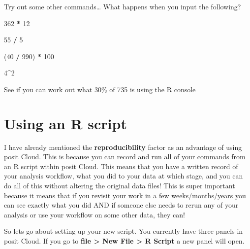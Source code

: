 \documentclass[
]{book}
\newenvironment{Shaded}{\begin{snugshade}}{\end{snugshade}}
\newcommand{\DecValTok}[1]{\textcolor[rgb]{0.00,0.00,0.81}{#1}}
\newcommand{\NormalTok}[1]{#1}
\newcommand{\SpecialCharTok}[1]{\textcolor[rgb]{0.81,0.36,0.00}{\textbf{#1}}}
\begin{document}
Try out some other commands\ldots{} What happens when you input the following?

\begin{Shaded}
\begin{Highlighting}[]
\DecValTok{362} \SpecialCharTok{*} \DecValTok{12}
\end{Highlighting}
\end{Shaded}

\begin{Shaded}
\begin{Highlighting}[]
\DecValTok{55} \SpecialCharTok{/} \DecValTok{5}
\end{Highlighting}
\end{Shaded}

\begin{Shaded}
\begin{Highlighting}[]
\NormalTok{(}\DecValTok{40} \SpecialCharTok{/} \DecValTok{990}\NormalTok{) }\SpecialCharTok{*} \DecValTok{100}
\end{Highlighting}
\end{Shaded}

\begin{Shaded}
\begin{Highlighting}[]
\DecValTok{4}\SpecialCharTok{\^{}}\DecValTok{2}
\end{Highlighting}
\end{Shaded}

See if you can work out what 30\% of 735 is using the R console

\hypertarget{using-an-r-script}{%
\section{Using an R script}\label{using-an-r-script}}

I have already mentioned the \textbf{reproducibility} factor as an advantage of using posit Cloud. This is because you can record and run all of your commands from an R script within posit Cloud. This means that you have a written record of your analysis workflow, what you did to your data at which stage, and you can do all of this without altering the original data files! This is super important because it means that if you revisit your work in a few weeks/months/years you can see exactly what you did AND if someone else needs to rerun any of your analysis or use your workflow on some other data, they can!

So lets go about setting up your new script. You currently have three panels in posit Cloud. If you go to \textbf{file \textgreater{} New File \textgreater{} R Script} a new panel will open.
\end{document}

